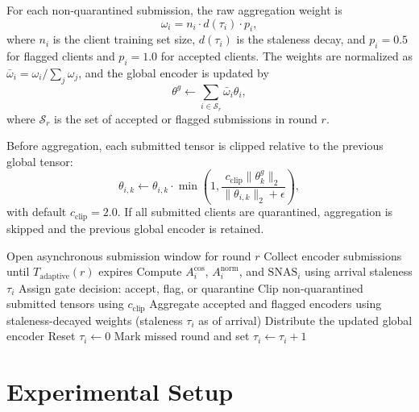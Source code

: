 \documentclass[pdflatex,sn-mathphys-num]{sn-jnl}
\begin{document}
For each non-quarantined submission, the raw aggregation weight is
\begin{equation}
    \omega_i = n_i \cdot d(\tau_i)\cdot p_i,
\end{equation}
where $n_i$ is the client training set size, $d(\tau_i)$ is the staleness decay, and $p_i=0.5$ for flagged clients and $p_i=1.0$ for accepted clients. The weights are normalized as $\bar{\omega}_i = \omega_i/\sum_j\omega_j$, and the global encoder is updated by
\begin{equation}
    \theta^g \leftarrow \sum_{i\in\mathcal{S}_r}\bar{\omega}_i\theta_i,
\end{equation}
where $\mathcal{S}_r$ is the set of accepted or flagged submissions in round $r$.

Before aggregation, each submitted tensor is clipped relative to the previous global tensor:
\begin{equation}
    \theta_{i,k}\leftarrow \theta_{i,k}\cdot \min\left(1,\frac{c_{\mathrm{clip}}\|\theta^g_k\|_2}{\|\theta_{i,k}\|_2+\epsilon}\right),
\end{equation}
with default $c_{\mathrm{clip}}=2.0$. If all submitted clients are quarantined, aggregation is skipped and the previous global encoder is retained.

\begin{algorithm}[t]
\caption{SENTINEL-SplitFed server round}
\label{alg:server}
\begin{algorithmic}[1]
\State Open asynchronous submission window for round $r$
\State Collect encoder submissions until $T_{\mathrm{adaptive}}(r)$ expires
        \State Compute $A^{\mathrm{cos}}_i$, $A^{\mathrm{norm}}_i$, and $\mathrm{SNAS}_i$ using arrival staleness $\tau_i$
        \State Assign gate decision: accept, flag, or quarantine
    \EndIf
\EndFor
\State Clip non-quarantined submitted tensors using $c_{\mathrm{clip}}$
\State Aggregate accepted and flagged encoders using staleness-decayed weights (staleness $\tau_i$ as of arrival)
\State Distribute the updated global encoder
        \State Reset $\tau_i\leftarrow0$
    \Else
        \State Mark missed round and set $\tau_i\leftarrow \tau_i+1$
    \EndIf
\EndFor
\end{algorithmic}
\end{algorithm}

\section{Experimental Setup}\label{sec:setup}
\end{document}
